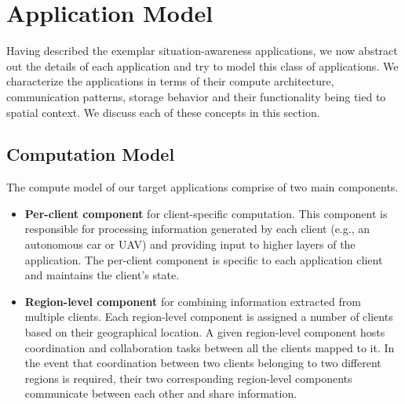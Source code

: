 \section{Application Model}
Having described the exemplar situation-awareness applications, we now abstract out the details of each application and try to model this class of applications. We characterize the applications in terms of their compute architecture, communication patterns, storage behavior and their functionality being tied to spatial context. We discuss each of these concepts in this section.

\subsection{Computation Model}
\label{sec:app_model_compute}
The compute model of our target applications comprise of two main components.
\begin{itemize}
\item \textbf{Per-client component} for client-specific computation. This component is responsible for processing information generated by each client (e.g., an autonomous car or UAV) and providing input to higher layers of the application. The per-client component is specific to each application client and maintains the client's state.
\item \textbf{Region-level component} for combining information extracted from multiple clients. Each region-level component is assigned a number of clients based on their geographical location. A given region-level component hosts  coordination and collaboration tasks between all the clients mapped to it. In the event that coordination between two clients belonging to two different regions is required, their two corresponding region-level components communicate between each other and share information.
\end{itemize}
